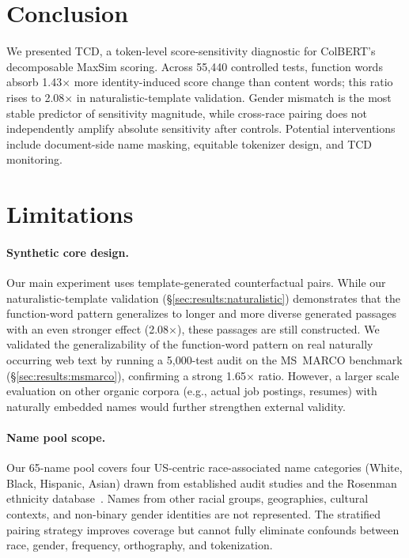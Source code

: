 \documentclass[11pt]{article}
\begin{document}
\section{Conclusion}
\label{sec:conclusion}

We presented TCD, a token-level score-sensitivity diagnostic for ColBERT's decomposable MaxSim scoring. Across 55{,}440 controlled tests, function words absorb 1.43$\times$ more identity-induced score change than content words; this ratio rises to 2.08$\times$ in naturalistic-template validation. Gender mismatch is the most stable predictor of sensitivity magnitude, while cross-race pairing does not independently amplify absolute sensitivity after controls. Potential interventions include document-side name masking, equitable tokenizer design, and TCD monitoring.


\section*{Limitations}

\paragraph{Synthetic core design.} Our main experiment uses template-generated counterfactual pairs. While our naturalistic-template validation (\S\ref{sec:results:naturalistic}) demonstrates that the function-word pattern generalizes to longer and more diverse generated passages with an even stronger effect (2.08$\times$), these passages are still constructed. We validated the generalizability of the function-word pattern on real naturally occurring web text by running a 5{,}000-test audit on the MS~MARCO benchmark (\S\ref{sec:results:msmarco}), confirming a strong 1.65$\times$ ratio. However, a larger scale evaluation on other organic corpora (e.g., actual job postings, resumes) with naturally embedded names would further strengthen external validity.

\paragraph{Name pool scope.} Our 65-name pool covers four US-centric race-associated name categories (White, Black, Hispanic, Asian) drawn from established audit studies and the Rosenman ethnicity database~\citep{rosenman2023}. Names from other racial groups, geographies, cultural contexts, and non-binary gender identities are not represented. The stratified pairing strategy improves coverage but cannot fully eliminate confounds between race, gender, frequency, orthography, and tokenization.
\end{document}
